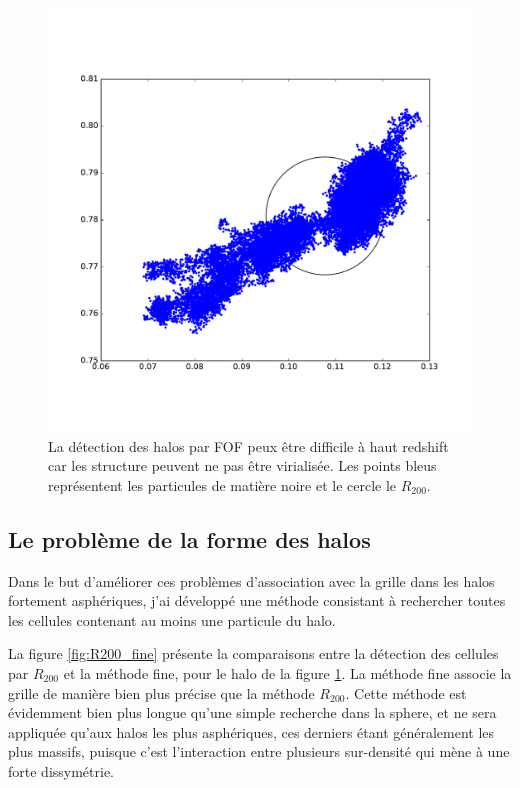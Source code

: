 \begin{figure}
	\centering
	\includegraphics[width=.65\textwidth]{img/03/part_halo_R200.pdf} 
    \caption[Détection des halos]{La détection des halos par \ac{FOF} peux être difficile à haut redshift car les structure peuvent ne pas être virialisée.
    Les points bleus représentent les particules de matière noire et le cercle le $R_{200}$.
 	\label{fig:part_halo}}
\end{figure}


\subsection{Le problème de la forme des halos}

Dans le but d'améliorer ces problèmes d'association avec la grille dans les halos fortement asphériques, j'ai développé une méthode consistant à rechercher toutes les cellules contenant au moins une particule du halo.

La figure \ref{fig:R200_fine} présente la comparaisons entre la détection des cellules par $R_{200}$ et la méthode fine, pour le halo de la figure \ref{fig:part_halo}.
La méthode fine associe la grille de manière bien plus précise que la méthode $R_{200}$.
Cette méthode est évidemment bien plus longue qu'une simple recherche dans la sphere, et ne sera appliquée qu'aux halos les plus asphériques, ces derniers étant généralement les plus massifs, puisque c'est l'interaction entre plusieurs sur-densité qui mène à une forte dissymétrie.

